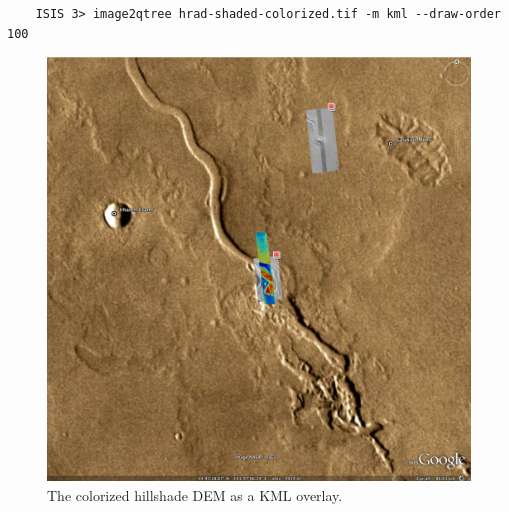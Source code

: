 \begin{verbatim}
    ISIS 3> image2qtree hrad-shaded-colorized.tif -m kml --draw-order 100
\end{verbatim}

\begin{figure}[b!]
\begin{center}
\includegraphics[width=6in]{images/p19-googlemars.png}
\caption[Hrad shaded colorized DEM as a KML overlay] {
    \label{hrad-kml}
        The colorized hillshade DEM as a KML overlay.  }
\end{center}
\end{figure}
